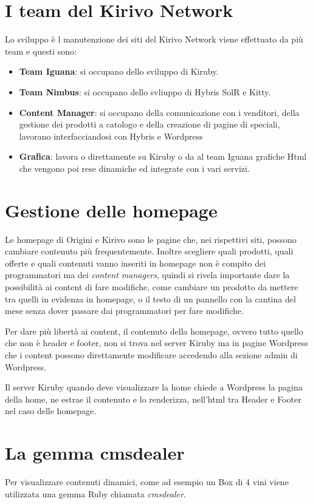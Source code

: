 
\section{I team del Kirivo Network}
Lo sviluppo è l manutenzione dei siti del Kirivo Network viene effettuato da più team e questi sono:
\begin{itemize}
\item {\bf Team Iguana}: si occupano dello sviluppo di Kiruby.
\item {\bf Team Nimbus}: si occupano dello svliuppo di Hybris SolR e Kitty.
\item {\bf Content Manager}: si occupano della comunicazione con i venditori, della gestione dei prodotti a catologo
 e della creazione di pagine di speciali, lavorano interfacciandosi con Hybris e Wordpress
\item {\bf Grafica}: lavora o direttamente su Kiruby o da al team Iguana grafiche Html che vengono poi rese dinamiche 
ed integrate con i vari servizi.
\end{itemize}

\section{Gestione delle homepage} 	

Le homepage di Origini e Kirivo sono le pagine che, nei rispettivi siti, possono cambiare contenuto più 
frequentemente. Inoltre scegliere quali prodotti, quali offerte e quali contenuti 
vanno inseriti in homepage non è compito dei programmatori ma dei \emph{content managers},
quindi si rivela importante dare la possibilità ai content di fare modifiche, come cambiare un prodotto da
mettere tra quelli in evidenza in homepage, o il testo di un pannello con la cantina del mese senza dover passare 
dai programmatori per fare modifiche.

Per dare più libertà ai content, il contenuto della homepage, ovvero tutto quello che non è
header e footer, non si trova nel server Kiruby ma in pagine Wordpress che i content possono direttamente 
modificare accedendo alla sezione admin di Wordpress.

Il server Kiruby quando deve visualizzare la home chiede a Wordpress la pagina della home, ne estrae
il contenuto e lo renderizza, nell'html tra Header e Footer nel caso delle homepage.

\section{La gemma cmsdealer}
Per visualizzare contenuti dinamici, come ad esempio un Box di 4 vini viene utilizzata
una gemma Ruby chiamata \emph{cmsdealer}.

